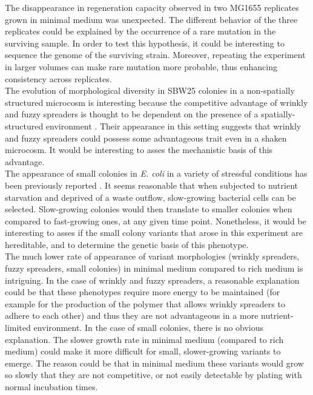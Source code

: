 \documentclass[
    11pt,
    a4paper,
    twoside
]{article} %
\begin{document}
\begin{multicols}{2}
The disappearance in regeneration capacity observed in two MG1655 replicates grown in minimal medium was unexpected.
The different behavior of the three replicates could be explained by the occurrence of a rare mutation in the surviving sample.
In order to test this hypothesis, it could be interesting to sequence the genome of the surviving strain.
Moreover, repeating the experiment in larger volumes can make rare mutation more probable, thus enhancing consistency across replicates.\\

The evolution of morphological diversity in SBW25 colonies in a non-spatially structured microcosm is interesting because the competitive advantage of wrinkly and fuzzy spreaders is thought to be dependent on the presence of a spatially-structured environment \citep{Rainey1998}.
Their appearance in this setting suggests that wrinkly and fuzzy spreaders could possess some advantageous trait even in a shaken microcosm.
It would be interesting to asses the mechanistic basis of this advantage.\\

The appearance of small colonies in \textit{E. coli} in a variety of stressful conditions has been previously reported \citep{Colwell1946, Santos2016, Tashiro2017}.
It seems reasonable that when subjected to nutrient starvation and deprived of a waste outflow, slow-growing bacterial cells can be selected.
Slow-growing colonies would then translate to smaller colonies when compared to fast-growing ones, at any given time point.
Nonetheless, it would be interesting to asses if the small colony variants that arose in this experiment are hereditable, and to determine the genetic basis of this phenotype.\\

The much lower rate of appearance of variant morphologies (wrinkly spreaders, fuzzy spreaders, small colonies) in minimal medium compared to rich medium is intriguing.
In the case of wrinkly and fuzzy spreaders, a reasonable explanation could be that these phenotypes require more energy to be maintained (for example for the production of the polymer that allows wrinkly spreaders to adhere to each other) and thus they are not advantageous in a more nutrient-limited environment.
In the case of small colonies, there is no obvious explanation.
The slower growth rate in minimal medium (compared to rich medium) could make it more difficult for small, slower-growing variants to emerge.
The reason could be that in minimal medium these variants would grow so slowly that they are not competitive, or not easily detectable by plating with normal incubation times.


\end{multicols}
\end{document}

